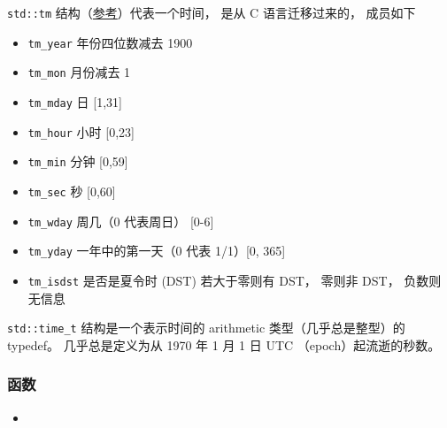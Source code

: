 

\verb|std::tm| 结构（\href{https://en.cppreference.com/w/cpp/chrono/c/tm}{参考}）代表一个时间， 是从 C 语言迁移过来的， 成员如下
\begin{itemize}
\item \verb|tm_year| 年份四位数减去 1900
\item \verb|tm_mon| 月份减去 1
\item \verb|tm_mday| 日 [1,31]
\item \verb|tm_hour| 小时 [0,23]
\item \verb|tm_min| 分钟 [0,59]
\item \verb|tm_sec| 秒 [0,60]
\end{itemize}
\begin{itemize}
\item \verb|tm_wday| 周几（0 代表周日） [0-6]
\item \verb|tm_yday| 一年中的第一天（0 代表 1/1）[0, 365]
\item \verb|tm_isdst| 是否是夏令时 (DST) 若大于零则有 DST， 零则非 DST， 负数则无信息
\end{itemize}

\verb|std::time_t| 结构是一个表示时间的 arithmetic 类型（几乎总是整型）的 typedef。 几乎总是定义为从 1970 年 1 月 1 日 UTC （epoch）起流逝的秒数。

\subsubsection{函数}
\begin{itemize}
\item 
\end{itemize}
